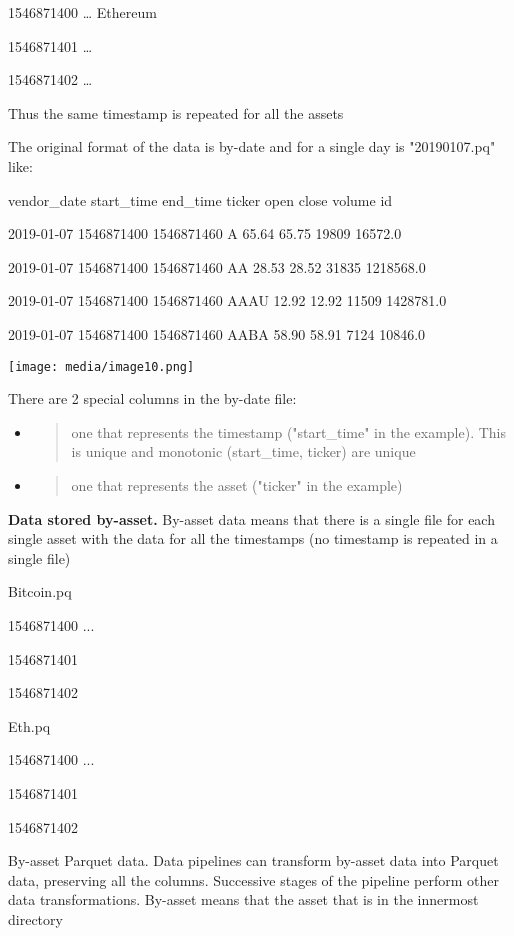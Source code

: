 \documentclass[11pt, reqno]{amsart}
\begin{document}
1546871400 \ldots{} Ethereum

1546871401 \ldots{}

1546871402 \ldots{}

Thus the same timestamp is repeated for all the assets

The original format of the data is by-date and for a single day is
"20190107.pq" like:

vendor\_date start\_time end\_time ticker open close volume id

2019-01-07 1546871400 1546871460 A 65.64 65.75 19809 16572.0

2019-01-07 1546871400 1546871460 AA 28.53 28.52 31835 1218568.0

2019-01-07 1546871400 1546871460 AAAU 12.92 12.92 11509 1428781.0

2019-01-07 1546871400 1546871460 AABA 58.90 58.91 7124 10846.0

\texttt{[image: media/image10.png]}

There are 2 special columns in the by-date file:

\begin{itemize}
\item
  \begin{quote}
  one that represents the timestamp ("start\_time" in the example). This
  is unique and monotonic (start\_time, ticker) are unique
  \end{quote}
\item
  \begin{quote}
  one that represents the asset ("ticker" in the example)
  \end{quote}
\end{itemize}

\textbf{Data stored by-asset.} By-asset data means that there is a
single file for each single asset with the data for all the timestamps
(no timestamp is repeated in a single file)

Bitcoin.pq

1546871400 ...

1546871401

1546871402

Eth.pq

1546871400 ...

1546871401

1546871402

By-asset Parquet data. Data pipelines can transform by-asset data into
Parquet data, preserving all the columns. Successive stages of the
pipeline perform other data transformations. By-asset means that the
asset that is in the innermost directory
\end{document}
